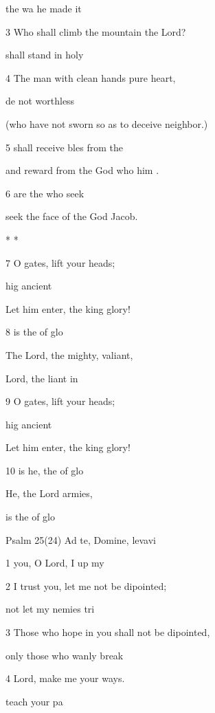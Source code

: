  the wa he made it  

3 Who shall climb the mountain  the Lord? 

 shall stand in  holy  

4 The man with clean hands  pure heart, 

 de not worthless  

(who have not sworn so as to deceive  neighbor.) 

5  shall receive bles from the  

and reward from the God who  him . 

6  are the  who seek  

seek the face of the God  Jacob. 

\mi{*} \pl{* * *} * * \pl{*} 

7 O gates, lift  your heads; 

 hig ancient  

Let him enter, the king  glory! 

8  is the  of glo 

The Lord, the mighty,  valiant, 

 Lord, the liant in  

9 O gates, lift  your heads; 

 hig ancient  

Let him enter, the king  glory! 

10  is he, the  of glo 

He, the Lord  armies, 

 is the  of glo 

Psalm 25(24) Ad te, Domine, levavi 


1  you, O Lord, I  up my  

2 I trust you, let me not be dipointed; 

 not let my nemies tri 

3 Those who hope in you shall not be dipointed, 

 only those who wanly break  

4 Lord, make me  your ways. 

 teach  your pa 

